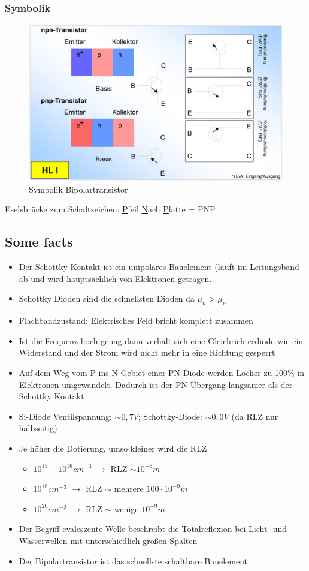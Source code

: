 \documentclass[12pt,a4paper]{report}%
\numberwithin{equation}{section}
\def\ul#1{\underline{#1}}
\numberwithin{equation}{subsection}
\begin{document}
		\subsubsection{Symbolik}
    \begin{figure}[H]
			  \centering
			  \captionsetup{justification=centering}
			  \includegraphics[width=0.6\linewidth]{bpt_symbolik.png}
			  \caption{Symbolik Bipolartransistor \protect\cite{MIKRO2}}
			  \label{fig:bpt_symbolik}
			\end{figure}
		Eselsbrücke zum Schaltzeichen: \ul{P}feil \ul{N}ach \ul{P}latte = PNP	
		\subsection{Some facts}
				\begin{itemize}
				  \item Der Schottky Kontakt ist ein unipolares Bauelement (läuft im Leitungsband ab und wird hauptsächlich von Elektronen getragen.
				  \item Schottky Dioden sind die schnellsten Dioden da $\mu_n > \mu_p$
				  \item Flachbandzustand: Elektrisches Feld bricht komplett zusammen
				  \item Ist die Frequenz hoch genug dann verhält sich eine Gleichrichterdiode wie ein Widerstand und der Strom wird nicht mehr in eine Richtung gesperrt
				  \item Auf dem Weg vom P ins N Gebiet einer PN Diode werden Löcher zu 100\% in Elektronen umgewandelt. Dadurch ist der PN-Übergang langsamer als der Schottky Kontakt
				  \item Si-Diode Ventilspannung: $\sim 0,7V$; Schottky-Diode: $\sim 0,3V$ (da RLZ nur halbseitig)
				  \item Je höher die Dotierung, umso kleiner wird die RLZ
				    \begin{itemize}
				      \item $10^{15} - 10^{16}cm^{-3}$ $\rightarrow$ RLZ $\sim 10^{-6}m$
				      \item $10^{18}cm^{-3}$ $\rightarrow$ RLZ $\sim$ mehrere $100\cdot 10^{-9}m$
				      \item $10^{20}cm^{-3}$ $\rightarrow$ RLZ $\sim$ wenige  $10^{-9}m$
				    \end{itemize}
				    \item Der Begriff evaleszente Welle beschreibt die Totalreflexion bei Licht- und Wasserwellen mit unterschiedlich großen Spalten
				    \item Der Bipolartransistor ist das schnellste schaltbare Bauelement
				\end{itemize}
	\newpage
	
\end{document}
